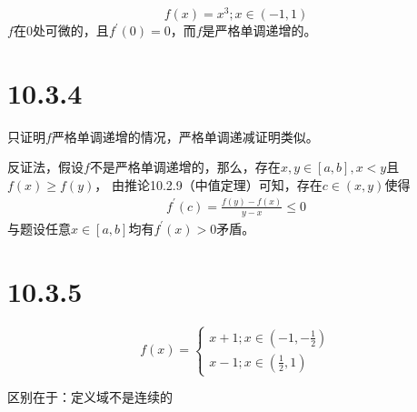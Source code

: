 \documentclass{article}
\begin{document}
\begin{equation*}
  f(x) = x^3; x \in (-1, 1)
\end{equation*}
$f$在$0$处可微的，且$f^\prime(0) = 0$，而$f$是严格单调递增的。

\section*{10.3.4}

只证明$f$严格单调递增的情况，严格单调递减证明类似。

反证法，假设$f$不是严格单调递增的，那么，存在$x, y \in [a, b], x < y$且$f(x) \geq f(y)$，
由推论10.2.9（中值定理）可知，存在$c \in (x, y)$使得
\begin{align*}
  f^\prime(c) = \frac{f(y) - f(x)}{y - x} \leq 0
\end{align*}
与题设任意$x \in [a, b]$均有$f^\prime(x) > 0$矛盾。

\section*{10.3.5}

\begin{equation*}
  f(x)=
  \begin{cases*}
    x + 1; x \in (-1, -\frac{1}{2}) \\
    x - 1; x \in (\frac{1}{2}, 1)
  \end{cases*}
\end{equation*}

区别在于：定义域不是连续的
\end{document}
